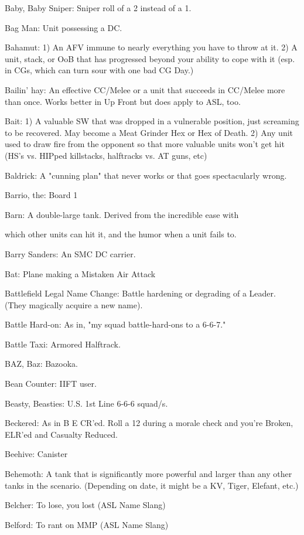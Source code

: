 \documentclass[letterpaper]{article}
\begin{document}
Baby, Baby Sniper: Sniper roll of a 2 instead of a 1.

Bag Man: Unit possessing a DC.

Bahamut: 1) An AFV immune to nearly everything you have to throw at it. 2) A unit, stack, or OoB that has progressed beyond your ability to cope with it (esp. in CGs, which can turn sour with one bad CG Day.)

Bailin' hay: An effective CC/Melee or a unit that succeeds in CC/Melee more than once.  Works better in Up Front but does apply to ASL, too.

Bait: 1) A valuable SW that was dropped in a vulnerable position, just screaming to be recovered. May become a Meat Grinder Hex or Hex of Death. 2) Any unit used to draw fire from the opponent so that more valuable units won't get hit (HS's vs. HIPped killstacks, halftracks vs. AT guns, etc)

Baldrick: A "cunning plan" that never works or that goes spectacularly wrong.

Barrio, the: Board 1

Barn: A double-large tank.  Derived from the incredible ease with

which other units can hit it, and the humor when a unit fails to.

Barry Sanders: An SMC DC carrier.

Bat: Plane making a Mistaken Air Attack

Battlefield Legal Name Change: Battle hardening or degrading of a Leader. (They magically acquire a new name).

Battle Hard-on:  As in, "my squad battle-hard-ons to a 6-6-7."

Battle Taxi: Armored Halftrack.

BAZ, Baz: Bazooka.

Bean Counter:  IIFT user.

Beasty, Beasties: U.S. 1st Line 6-6-6 squad/s.

Beckered: As in B E CR'ed.  Roll a 12 during a morale check and you're Broken, ELR'ed and Casualty Reduced.

Beehive: Canister

Behemoth: A tank that is significantly more powerful and larger than any other tanks in the scenario. (Depending on date, it might be a KV, Tiger, Elefant, etc.)

Belcher: To lose, you lost (ASL Name Slang)

Belford: To rant on MMP (ASL Name Slang)
\end{document}

